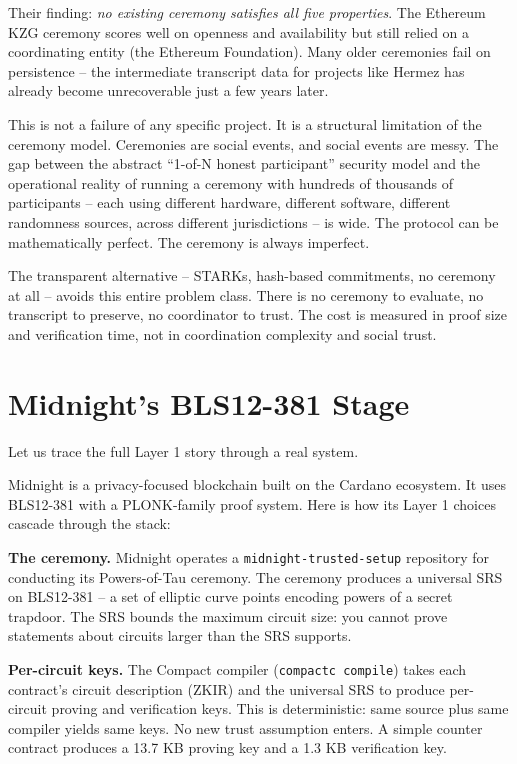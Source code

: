 \documentclass[
  11pt,
  openany]{report}
\renewcommand{\textbf}[1]{{\bfseries\color{MidnightBold}#1}}
\begin{document}
Their finding: \emph{no existing ceremony satisfies all five properties}. The
Ethereum KZG ceremony scores well on openness and availability but still relied
on a coordinating entity (the Ethereum Foundation). Many older ceremonies fail
on persistence -- the intermediate transcript data for projects like Hermez has
already become unrecoverable just a few years later.

This is not a failure of any specific project. It is a structural limitation of
the ceremony model. Ceremonies are social events, and social events are messy.
The gap between the abstract ``1-of-N honest participant'' security model and
the operational reality of running a ceremony with hundreds of thousands of
participants -- each using different hardware, different software, different
randomness sources, across different jurisdictions -- is wide. The protocol can
be mathematically perfect. The ceremony is always imperfect.

The transparent alternative -- STARKs, hash-based commitments, no ceremony at
all -- avoids this entire problem class. There is no ceremony to evaluate, no
transcript to preserve, no coordinator to trust. The cost is measured in proof
size and verification time, not in coordination complexity and social trust.

\section{Midnight's BLS12-381 Stage}\label{midnights-bls12-381-stage}

Let us trace the full Layer 1 story through a real system.

Midnight is a privacy-focused blockchain built on the Cardano ecosystem. It uses
BLS12-381 with a PLONK-family proof system. Here is how its Layer 1 choices
cascade through the stack:

\textbf{The ceremony.} Midnight operates a \texttt{midnight-trusted-setup}
repository for conducting its Powers-of-Tau ceremony. The ceremony produces a
universal SRS on BLS12-381 -- a set of elliptic curve points encoding powers of
a secret trapdoor. The SRS bounds the maximum circuit size: you cannot prove
statements about circuits larger than the SRS supports.

\textbf{Per-circuit keys.} The Compact compiler (\texttt{compactc\ compile})
takes each contract's circuit description (ZKIR) and the universal SRS to
produce per-circuit proving and verification keys. This is deterministic: same
source plus same compiler yields same keys. No new trust assumption enters. A
simple counter contract produces a 13.7 KB proving key and a 1.3 KB verification
key.
\end{document}
